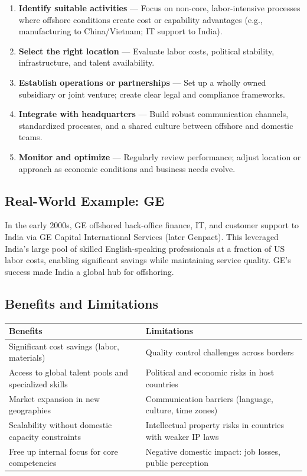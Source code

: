 \documentclass[11pt, letterpaper]{article}
\begin{document}
\begin{enumerate}[leftmargin=*, label=\textbf{Step \arabic*.}]
  \item \textbf{Identify suitable activities} --- Focus on non-core, labor-intensive processes where offshore conditions create cost or capability advantages (e.g., manufacturing to China/Vietnam; IT support to India).
  \item \textbf{Select the right location} --- Evaluate labor costs, political stability, infrastructure, and talent availability.
  \item \textbf{Establish operations or partnerships} --- Set up a wholly owned subsidiary or joint venture; create clear legal and compliance frameworks.
  \item \textbf{Integrate with headquarters} --- Build robust communication channels, standardized processes, and a shared culture between offshore and domestic teams.
  \item \textbf{Monitor and optimize} --- Regularly review performance; adjust location or approach as economic conditions and business needs evolve.
\end{enumerate}

\subsection{Real-World Example: GE}

In the early 2000s, GE offshored back-office finance, IT, and customer support to India via GE Capital International Services (later Genpact). This leveraged India's large pool of skilled English-speaking professionals at a fraction of US labor costs, enabling significant savings while maintaining service quality. GE's success made India a global hub for offshoring.

\subsection{Benefits and Limitations}

\begin{center}
\begin{tabular}{p{6.5cm} p{6.5cm}}
\toprule
\textbf{Benefits} & \textbf{Limitations} \\
\midrule
Significant cost savings (labor, materials) & Quality control challenges across borders \\
Access to global talent pools and specialized skills & Political and economic risks in host countries \\
Market expansion in new geographies & Communication barriers (language, culture, time zones) \\
Scalability without domestic capacity constraints & Intellectual property risks in countries with weaker IP laws \\
Free up internal focus for core competencies & Negative domestic impact: job losses, public perception \\
\bottomrule
\end{tabular}
\end{center}
\end{document}
